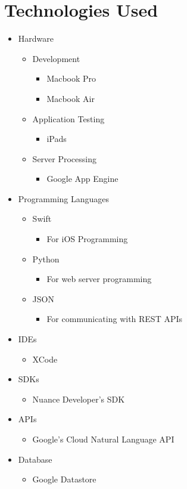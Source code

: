\chapter{Technologies Used}

\begin{itemize}
    \item Hardware
    \begin{itemize}
   	 \item Development
	 \begin{itemize}
   	 	\item Macbook Pro
		\item Macbook Air
	\end{itemize}
	 \item Application Testing
	  \begin{itemize}
   	 	\item iPads
	\end{itemize}
	 \item Server Processing
	  \begin{itemize}
		\item Google App Engine
	\end{itemize}
    \end{itemize}
    \item Programming Languages
     \begin{itemize}
   	 	\item Swift
		 \begin{itemize}
   	 		\item For iOS Programming
		\end{itemize}
		\item Python
		 \begin{itemize}
   	 		\item For web server programming
		\end{itemize}
		\item JSON
		\begin{itemize}
   	 		\item For communicating with REST APIs
		\end{itemize}
	\end{itemize}
    \item IDEs
     \begin{itemize}
   	 	\item XCode
	\end{itemize}
 \item SDKs
     \begin{itemize}
		\item Nuance Developer's SDK
	\end{itemize}
    \item APIs
     \begin{itemize}
		\item Google's Cloud Natural Language API
	\end{itemize}
    \item Database
     \begin{itemize}
   	 	\item Google Datastore
	\end{itemize}
\end{itemize}